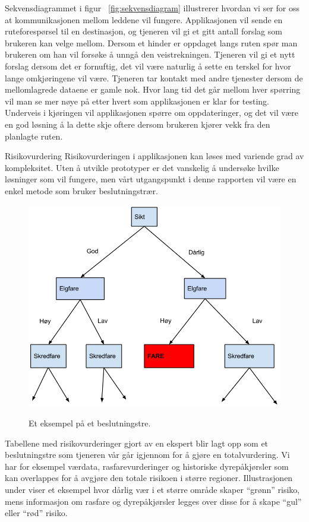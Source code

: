 \documentclass[a4paper,norsk,oneside]{book}
\begin{document}
Sekvensdiagrammet i figur ~\ref{fig:sekvensdiagram} illustrerer hvordan vi ser for oss at kommunikasjonen mellom leddene vil fungere. Applikasjonen vil sende en ruteforespørsel til en destinasjon, og tjeneren vil gi et gitt antall forslag som brukeren kan velge mellom. Dersom et hinder er oppdaget langs ruten spør man brukeren om han vil forsøke å unngå den veistrekningen. Tjeneren vil gi et nytt forslag dersom det er fornuftig, det vil være naturlig å sette en terskel for hvor lange omkjøringene vil være.
Tjeneren tar kontakt med andre tjenester dersom de mellomlagrede dataene er gamle nok. Hvor lang tid det går mellom hver spørring vil man se mer nøye på etter hvert som applikasjonen er klar for testing.
Underveis i kjøringen vil applikasjonen spørre om oppdateringer, og det vil være en god løsning å la dette skje oftere dersom brukeren kjører vekk fra den planlagte ruten.

Risikovurdering
Risikovurderingen i applikasjonen kan løses med variende grad av kompleksitet. Uten å utvikle prototyper er det vanskelig å undersøke hvilke løsninger som vil fungere, men vårt utgangspunkt i denne rapporten vil være en enkel metode som bruker beslutningstrær.

\begin{figure}[H]
\centering
\includegraphics[scale=0.35]{figs/decision.png}
\label{desicion}
\caption{Et eksempel på et beslutningstre.}
\end{figure}

Tabellene med risikovurderinger gjort av en ekspert blir lagt opp som et beslutningstre som tjeneren vår går igjennom for å gjøre en totalvurdering. Vi har for eksempel værdata, rasfarevurderinger og historiske dyrepåkjørsler som kan overlappes for å avgjøre den totale risikoen i større regioner. Illustrasjonen under viser et eksempel hvor dårlig vær i et større område skaper “grønn” risiko, mens informasjon om rasfare og dyrepåkjørsler legges over disse for å skape “gul” eller “rød” risiko.
\end{document}
